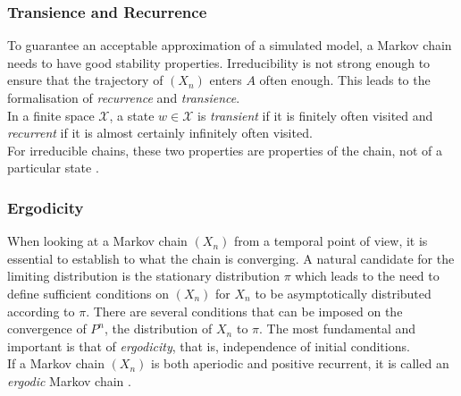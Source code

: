 \subsubsection{Transience and Recurrence} 
To guarantee an acceptable approximation of a simulated model, a Markov chain needs to have good stability properties. Irreducibility is not strong enough to ensure that the trajectory of $\left(X_n\right)$ enters $A$ often enough. This leads to the formalisation of \textit{recurrence} and \textit{transience}.  \\
In a finite space $\mathcal{X}$, a state $w\in\mathcal{X}$ is \textit{transient} if it is finitely often visited and \textit{recurrent} if it is almost certainly infinitely often visited. \\
For irreducible chains, these two properties are properties of the chain, not of a particular state \autocite[][218--219]{robert2013monte}.
\subsubsection{Ergodicity}
When looking at a Markov chain $\left(X_n\right)$ from a temporal point of view, it is essential to establish to what the chain is converging. A natural candidate for the limiting distribution is the stationary distribution $\pi$ which leads to the need to define sufficient conditions on $\left(X_n\right)$ for $X_n$ to be asymptotically distributed according to $\pi$. There are several conditions that can be imposed on the convergence of $P^n$, the distribution of $X_n$ to $\pi$. The most fundamental and important is that of \textit{ergodicity}, that is, independence of initial conditions.\\
If a Markov chain $\left(X_n\right)$ is both aperiodic and positive recurrent, it is called an \textit{ergodic} Markov chain \autocite[][231--234]{robert2013monte}.
